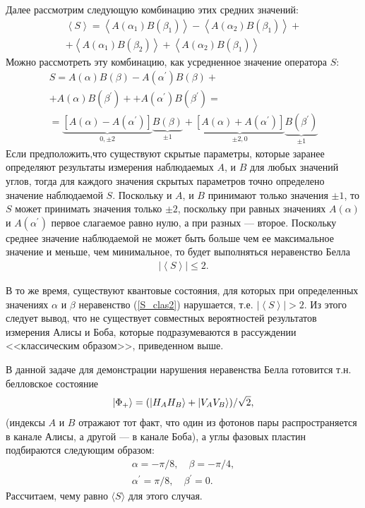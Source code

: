 \documentclass[12pt,a5paper]{article}
\numberwithin{equation}{section}
\begin{document}
Далее рассмотрим следующую комбинацию этих средних значений:
\begin{gather}
     \left<S\right>=\left<A(\alpha_1)B(\beta_1)\right>-
     \left<A(\alpha_2)B(\beta_1)\right>+\\ \nonumber
    + \left<A(\alpha_1)B(\beta_2)\right>+
     \left<A(\alpha_2)B(\beta_1)\right>
\end{gather}
Можно рассмотреть эту комбинацию, как усредненное значение оператора $S$:
\begin{gather}
     S=A(\alpha)B(\beta)-
     A(\alpha^\prime)B(\beta)+\\ \nonumber
    + A(\alpha)B(\beta^\prime)+
     +A(\alpha^\prime)B(\beta^\prime)=\\ \nonumber
     =
     \underbrace{\left[A(\alpha)-A(\alpha^\prime)\right ]}_{0,\pm 2}
     \underbrace{B(\beta)}_{\pm 1}+
     \underbrace{\left[A(\alpha)+A(\alpha^\prime)\right]}_{\pm2,0}
     \underbrace{B(\beta^\prime)}_{\pm 1}
\end{gather}
Если предположить,что существуют скрытые параметры, которые заранее определяют результаты измерения наблюдаемых $A$, и $B$ для любых значений углов, тогда для каждого значения скрытых параметров точно определено значение наблюдаемой $S$. 
Поскольку и $A$, и $B$ принимают только значения $\pm1$, то $S$ может принимать значения только $\pm 2$, поскольку при равных значениях $A(\alpha)$ и $A(\alpha^\prime)$ первое слагаемое равно нулю, а при разных --- второе. Поскольку среднее значение наблюдаемой не может быть больше чем ее максимальное значение и меньше, чем минимальное, то будет выполняться неравенство Белла
\begin{gather}
\left|\left<S\right>\right| \le 2.
\label{S_clas2}
\end{gather}

В то же время, существуют квантовые состояния, для которых при определенных значениях $\alpha$ и $\beta$ неравенство (\ref{S_clas2}) нарушается, т.е. $\left|\left<S\right>\right| > 2$. Из этого следует вывод, что не существует совместных вероятностей результатов измерения Алисы и Боба, которые подразумеваются в рассуждении <<классическим образом>>, приведенном выше.

В данной задаче для демонстрации нарушения неравенства Белла готовится т.н. белловское состояние
\begin{gather}
\ket{\Phi_+}=(\ket{H_A H_B}+\ket{V_A V_B})/ \sqrt2,
\label{Bell_state}
\end{gather}
(индексы $A$ и $B$ отражают тот факт, что один из фотонов пары распространяется в канале Алисы, а другой --- в канале Боба), а углы фазовых пластин подбираются следующим образом:
\begin{gather}
\alpha=-\pi/8, \quad \beta=-\pi/4,\nonumber\\
\alpha^\prime=\pi/8, \quad \beta^\prime=0.
\label{alpha_beta}
\end{gather}
Рассчитаем, чему равно $\langle S \rangle$ для этого случая.
\end{document}
